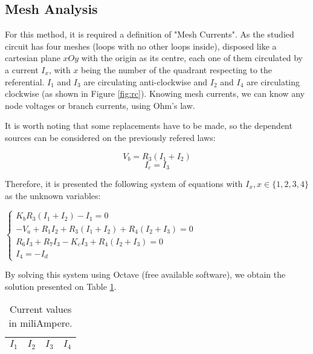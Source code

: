\subsection{Mesh Analysis}
\label{sec:2.1}

\vspace{3mm}
\par For this method, it is required a definition of "Mesh Currents". As the studied circuit has four meshes (loops with no other loops inside), disposed like a cartesian plane $xOy$ with the origin as its centre, each one of them circulated by a current $I_x$, with $x$ being the number of the quadrant respecting to the referential. $I_1$ and $I_3$ are circulating anti-clockwise and $I_2$ and $I_4$ are circulating clockwise (as shown in Figure \ref{fig:rc}). Knowing mesh currents, we can know any node voltages or branch currents, using Ohm’s law.
\vspace{3mm}
\par It is worth noting that some replacements have to be made, so the dependent sources can be considered on the previously refered laws:

\vspace{3mm}
\begin{equation}
  \label{eq4}
   V_b=R_3(I_1+I_2)
\end{equation}
\begin{equation}
  \label{eq5}
   I_c=I_3
\end{equation}
\vspace{3mm}

\par Therefore, it is presented the following system of equations with $I_x , x\in{\{1,2,3,4\}}$ as the unknown variables: 

\vspace{5mm}
\begin{center}
$\begin{cases} K_bR_3(I_1+I_2)-I_1=0 \\ -V_a +R_1I_2 + R_3(I_1+I_2) + R_4(I_2+I_3) = 0 \\ R_6I_3 + R_7I_3 - K_cI_3 + R_4(I_2+I_3) = 0 \\ I_4 = -I_d \end{cases}$
\vspace{5mm}
\end{center}
\par By solving this system using Octave (free available software), we obtain the solution presented on Table \ref{tab_malha}. 
\newpage
\vspace{7mm}
\renewcommand{\arraystretch}{1.5}
\begin{table}[h]
  \centering
  \begin{tabular}{|c|c|c|c|}
    \hline    
    $I_1$ & $I_2$ & $I_3$ & $I_4$ \\\hline
     \hline
  \end{tabular}
  \caption{Current values in miliAmpere.}
  \label{tab_malha}
\end{table}


